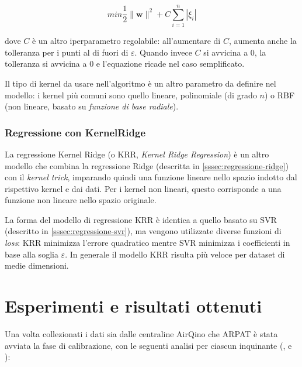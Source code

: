  $$min \frac{1}{2}\|\mathbf{w}\|^{2} + C \sum_{i=1}^{n}\left|\xi_{i}\right|$$\smallskip

dove $C$ è un altro iperparametro regolabile: all'aumentare di $C$, aumenta anche la tolleranza per i punti al di fuori di $\varepsilon$. Quando invece $C$ si avvicina a 0, la tolleranza si avvicina a 0 e l'equazione ricade nel caso semplificato.

Il tipo di kernel da usare nell'algoritmo è un altro parametro da definire nel modello: i kernel più comuni sono quello lineare, polinomiale (di grado $n$) o RBF (non lineare, basato su \textit{funzione di base radiale}).

\subsubsection{Regressione con KernelRidge}\label{sssec:regressione-kridge}
La regressione Kernel Ridge (o KRR, \textit{Kernel Ridge Regression}) è un altro modello che combina la regressione Ridge (descritta in \ref{sssec:regressione-ridge}) con il \textit{kernel trick}, imparando quindi una funzione lineare nello spazio indotto dal rispettivo kernel e dai dati. Per i kernel non lineari, questo corrisponde a una funzione non lineare nello spazio originale. \cite{krr}

La forma del modello di regressione KRR è identica a quello basato su SVR (descritto in \ref{sssec:regressione-svr}), ma vengono utilizzate diverse funzioni di \textit{loss}: KRR minimizza l'errore quadratico mentre SVR minimizza i coefficienti in base alla soglia $\varepsilon$. In generale il modello KRR risulta più veloce per dataset di medie dimensioni. \cite{krr}

\clearpage
\section{Esperimenti e risultati ottenuti}\label{sec:esperimenti}
Una volta collezionati i dati sia dalle centraline AirQino che ARPAT è stata avviata la fase di calibrazione, con le seguenti analisi per ciascun inquinante (,  e ):

